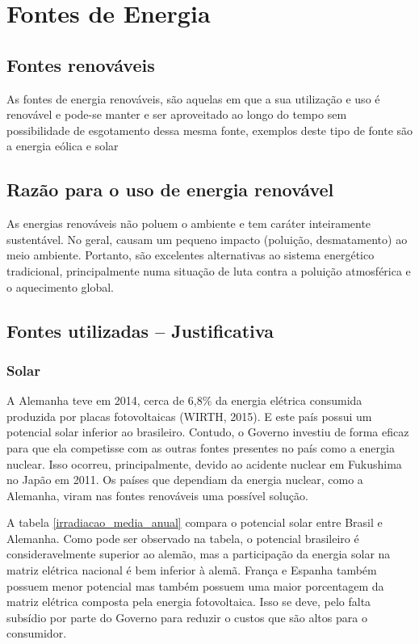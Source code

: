 \section{Fontes de Energia}

\subsection{Fontes renováveis}

	As fontes de energia renováveis, são aquelas em que a sua utilização e uso é renovável e pode-se manter e ser aproveitado ao longo do tempo sem possibilidade de esgotamento dessa mesma fonte, exemplos deste tipo de fonte são a energia eólica e solar\cite{2007RevUSP}

\subsection{Razão para o uso de energia renovável}

	As energias renováveis não poluem o ambiente e tem caráter inteiramente sustentável. No geral, causam um pequeno impacto (poluição, desmatamento) ao meio ambiente. Portanto, são excelentes alternativas ao sistema energético tradicional, principalmente numa situação de luta contra a poluição atmosférica e o aquecimento global.

\subsection{Fontes utilizadas -- Justificativa}
\subsubsection{Solar}

	A Alemanha teve em 2014, cerca de 6,8\% da energia elétrica consumida produzida por placas fotovoltaicas (WIRTH, 2015). E este país possui um potencial solar inferior ao brasileiro. Contudo, o Governo investiu de forma eficaz para que ela competisse com as outras fontes presentes no país como a energia nuclear. Isso ocorreu, principalmente, devido ao acidente nuclear em Fukushima no Japão em 2011. Os países que dependiam da energia nuclear, como a Alemanha, viram nas fontes renováveis uma possível solução.

	A tabela \ref{irradiacao_media_anual} compara o potencial solar entre Brasil e Alemanha. Como pode ser observado na tabela, o potencial brasileiro é consideravelmente superior ao alemão, mas a participação da energia solar na matriz elétrica nacional é bem inferior à alemã. França e Espanha também possuem menor potencial mas também possuem uma maior porcentagem da matriz elétrica composta pela energia fotovoltaica. Isso se deve, pelo falta subsídio por parte do Governo para reduzir o custos que são altos para o consumidor.

